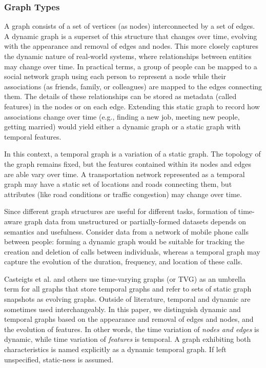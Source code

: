 \subsubsection{Graph Types} %
A graph consists of a set of vertices (as nodes) interconnected by a set of edges. A dynamic graph is a superset of this structure that changes over time, evolving with the appearance and removal of edges and nodes. This more closely captures the dynamic nature of real-world systems, where relationships between entities may change over time. In practical terms, a group of people can be mapped to a social network graph using each person to represent a node while their associations (as friends, family, or colleagues) are mapped to the edges connecting them. The details of these relationships can be stored as metadata (called features) in the nodes or on each edge. Extending this static graph to record how associations change over time (e.g., finding a new job, meeting new people, getting married) would yield either a dynamic graph or a static graph with temporal features.

In this context, a temporal graph is a variation of a static graph. The topology of the graph remains fixed, but the features contained within its nodes and edges are able vary over time. A transportation network represented as a temporal graph may have a static set of locations and roads connecting them, but attributes (like road conditions or traffic congestion) may change over time.

Since different graph structures are useful for different tasks, formation of time-aware graph data from unstructured or partially-formed datasets depends on semantics and usefulness. Consider data from a network of mobile phone calls between people: forming a dynamic graph would be suitable for tracking the creation and deletion of calls between individuals, whereas a temporal graph may capture the evolution of the duration, frequency, and location of these calls.

Casteigts et al.\cite{casteigts_time-varying_2012} and others use time-varying graphs (or TVG) as an umbrella term for all graphs that store temporal graphs and refer to sets of static graph snapshots as evolving graphs. Outside of literature, temporal and dynamic are sometimes used interchangeably. In this paper, we distinguish dynamic and temporal graphs based on the appearance and removal of edges and nodes, and the evolution of features. In other words, the time variation of \textit{nodes and edges} is dynamic, while time variation of \textit{features} is temporal. A graph exhibiting both characteristics is named explicitly as a dynamic temporal graph. If left unspecified, static-ness is assumed.

